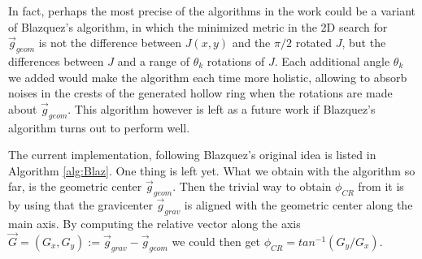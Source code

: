 \documentclass[11pt, a4paper, twoside]{article} %
\begin{document}
\vspace{-0.2cm}


In fact, perhaps the most precise of the algorithms in the work could be a variant of Blazquez's algorithm, in which the minimized metric in the 2D search for $\vec{g}_{geom}$ is not the difference between $J(x,y)$ and the $\pi/2$ rotated $J$, but the differences between $J$ and a range of $\theta_k$ rotations of $J$. Each additional angle $\theta_k$ we added would make the algorithm each time more holistic, allowing to absorb noises in the crests of the generated hollow ring when the rotations are made about $\vec{g}_{geom}$. This algorithm however is left as a future work if Blazquez's algorithm turns out to perform well.\vspace{-0.1cm}

The current implementation, following Blazquez's original idea is listed in Algorithm \ref{alg:Blaz}. One thing is left yet. What we obtain with the algorithm so far, is the geometric center $\vec{g}_{geom}$. Then the trivial way to obtain $\phi_{CR}$ from it is by using that the gravicenter $\vec{g}_{grav}$ is aligned with the geometric center along the main axis. By computing the relative vector along the axis $\vec{G}=(G_x,G_y):=\vec{g}_{grav}-\vec{g}_{geom}$ we could then get $\phi_{CR}=tan^{-1}(G_y/G_x)$.\vspace{-0.2cm}
\end{document}
